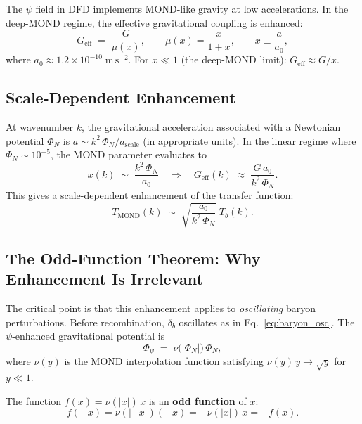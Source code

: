 \documentclass[12pt,a4paper]{article}
\newcommand{\Geff}{G_{\mathrm{eff}}}
\newcommand{\azero}{a_0}
\begin{document}
The $\psi$ field in DFD implements MOND-like gravity at low
accelerations. In the deep-MOND regime, the effective gravitational
coupling is enhanced:
\begin{equation}
  \Geff \;=\; \frac{G}{\mu(x)},
  \qquad
  \mu(x) = \frac{x}{1+x},
  \qquad
  x \equiv \frac{a}{\azero},
\end{equation}
where $\azero \approx 1.2 \times 10^{-10}\;\mathrm{m\,s}^{-2}$. For
$x \ll 1$ (the deep-MOND limit): $\Geff \approx G/x$.

\subsection{Scale-Dependent Enhancement}

At wavenumber $k$, the gravitational acceleration associated with a
Newtonian potential $\Phi_N$ is $a \sim k^2\,\Phi_N/a_{\mathrm{scale}}$
(in appropriate units). In the linear regime where
$\Phi_N \sim 10^{-5}$, the MOND parameter evaluates to
\begin{equation}
  x(k) \;\sim\; \frac{k^2\,\Phi_N}{\azero}
  \quad\Longrightarrow\quad
  \Geff(k) \;\approx\; \frac{G\,\azero}{k^2\,\Phi_N}.
\end{equation}
This gives a scale-dependent enhancement of the transfer function:
\begin{equation}
  T_{\mathrm{MOND}}(k) \;\sim\; \sqrt{\frac{\azero}{k^2\,\Phi_N}}\;
  T_b(k).
  \label{eq:T_MOND}
\end{equation}

\subsection{The Odd-Function Theorem: Why Enhancement Is Irrelevant}
\label{sec:odd_function}

The critical point is that this enhancement applies to \emph{oscillating}
baryon perturbations. Before recombination, $\delta_b$ oscillates as in
Eq.~\eqref{eq:baryon_osc}. The $\psi$-enhanced gravitational potential
is
\begin{equation}
  \Phi_\psi \;=\; \nu\!\bigl(|\Phi_N|\bigr)\,\Phi_N,
\end{equation}
where $\nu(y)$ is the MOND interpolation function satisfying
$\nu(y)\,y \to \sqrt{y}$ for $y \ll 1$.

The function $f(x) = \nu(|x|)\,x$ is an \textbf{odd function} of $x$:
\begin{equation}
  f(-x) = \nu(|-x|)(-x) = -\nu(|x|)\,x = -f(x).
\end{equation}
\end{document}
